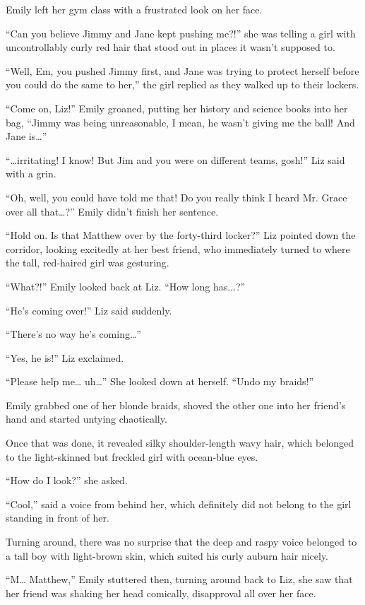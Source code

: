 Emily left her gym class with a frustrated look on her face.

“Can you believe Jimmy and Jane kept pushing me?!” she was telling a girl with uncontrollably curly red hair that stood out in places it wasn’t supposed to.

“Well, Em, you pushed Jimmy first, and Jane was trying to protect herself before you could do the same to her,” the girl replied as they walked up to their lockers.

“Come on, Liz!” Emily groaned, putting her history and science books into her bag, “Jimmy was being unreasonable, I mean, he wasn’t giving me the ball! And Jane is…”

“…irritating! I know! But Jim and you were on different teams, gosh!” Liz said with a grin.

“Oh, well, you could have told me that! Do you really think I heard Mr. Grace over all that…?” Emily didn’t finish her sentence.

“Hold on. Is that Matthew over by the forty-third locker?” Liz pointed down the corridor, looking excitedly at her best friend, who immediately turned to where the tall, red-haired girl was gesturing.

“What?!” Emily looked back at Liz. “How long has...?”

“He’s coming over!” Liz said suddenly.

“There’s no way he’s coming…”

“Yes, he is!” Liz exclaimed.

“Please help me… uh…” She looked down at herself. “Undo my braids!”

Emily grabbed one of her blonde braids, shoved the other one into her friend’s hand and started untying chaotically.

Once that was done, it revealed silky shoulder-length wavy hair, which belonged to the light-skinned but freckled girl with ocean-blue eyes.

“How do I look?” she asked.

“Cool,” said a voice from behind her, which definitely did not belong to the girl standing in front of her.

Turning around, there was no surprise that the deep and raspy voice belonged to a tall boy with light-brown skin, which suited his curly auburn hair nicely.

“M… Matthew,” Emily stuttered then, turning around back to Liz, she saw that her friend was shaking her head comically, disapproval all over her face.

